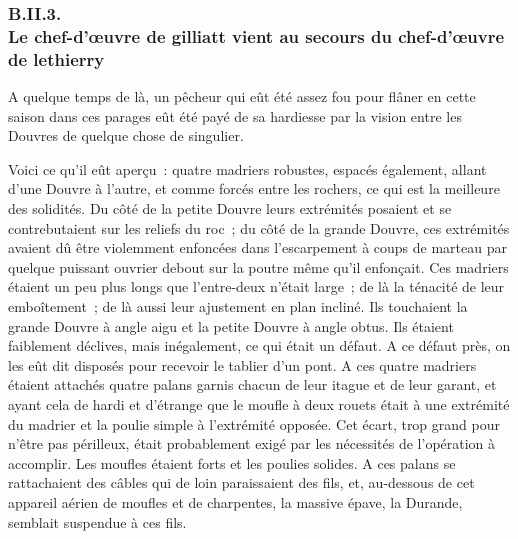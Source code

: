 \documentclass[french,twoside]{book} %
\begin{document}
 \subsubsection[{B.II.3. Le chef-d’œuvre de gilliatt vient au secours du chef-d’œuvre de lethierry}]{B.II.3. \\
Le chef-d’œuvre de gilliatt vient au secours du chef-d’œuvre de lethierry}
\noindent A quelque temps de là, un pêcheur qui eût été assez fou pour flâner en cette saison dans ces parages eût été payé de sa hardiesse par la vision entre les Douvres de quelque chose de singulier.\par
Voici ce qu’il eût aperçu : quatre madriers robustes, espacés également, allant d’une Douvre à l’autre, et comme forcés entre les rochers, ce qui est la meilleure des solidités. Du côté de la petite Douvre leurs extrémités posaient et se contrebutaient sur les reliefs du roc ; du côté de la grande Douvre, ces extrémités avaient dû être violemment enfoncées dans l’escarpement à coups de marteau par quelque puissant ouvrier debout sur la poutre même qu’il enfonçait. Ces madriers étaient un peu plus longs que l’entre-deux n’était large ; de là la ténacité de leur emboîtement ; de là aussi leur ajustement en plan incliné. Ils touchaient la grande Douvre  à angle aigu et la petite Douvre à angle obtus. Ils étaient faiblement déclives, mais inégalement, ce qui était un défaut. A ce défaut près, on les eût dit disposés pour recevoir le tablier d’un pont. A ces quatre madriers étaient attachés quatre palans garnis chacun de leur itague et de leur garant, et ayant cela de hardi et d’étrange que le moufle à deux rouets était à une extrémité du madrier et la poulie simple à l’extrémité opposée. Cet écart, trop grand pour n’être pas périlleux, était probablement exigé par les nécessités de l’opération à accomplir. Les moufles étaient forts et les poulies solides. A ces palans se rattachaient des câbles qui de loin paraissaient des fils, et, au-dessous de cet appareil aérien de moufles et de charpentes, la massive épave, la Durande, semblait suspendue à ces fils.\par
\end{document}
